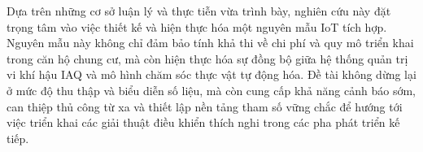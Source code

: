 Dựa trên những cơ sở luận lý và thực tiễn vừa trình bày, nghiên cứu này đặt trọng tâm vào việc thiết kế và hiện thực hóa một nguyên mẫu IoT tích hợp. Nguyên mẫu này không chỉ đảm bảo tính khả thi về chi phí và quy mô triển khai trong căn hộ chung cư, mà còn hiện thực hóa sự đồng bộ giữa hệ thống quản trị vi khí hậu IAQ và mô hình chăm sóc thực vật tự động hóa. Đề tài không dừng lại ở mức độ thu thập và biểu diễn số liệu, mà còn cung cấp khả năng cảnh báo sớm, can thiệp thủ công từ xa và thiết lập nền tảng tham số vững chắc để hướng tới việc triển khai các giải thuật điều khiển thích nghi trong các pha phát triển kế tiếp.